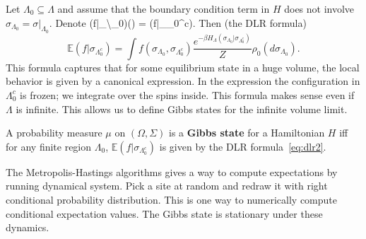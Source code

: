 \documentclass[12pt]{book}
\theoremstyle{norm}
\begin{document}
Let $\Lambda_0\subseteq \Lambda$ and assume that the boundary condition term in $H$ does not involve $\sigma_{\Lambda_0}=\sigma|_{\Lambda_0}$. Denote 
\be{}(f|\Sigma_{\Lambda\backslash \Lambda_0})(\sigma) = (f|\sigma_{\Lambda_0^c}). \ee
Then (the DLR formula)
\begin{equation}\label{eq:dlr2}
\mathbb{E}(f|\sigma_{\Lambda_0^c}) = \int f(\sigma_{\Lambda_0}, \sigma_{\Lambda_0^c})  \frac{e^{-\beta H_{\Lambda}(\sigma_{\Lambda_0}| \sigma_{\Lambda_0^c})}}{Z}\rho_0(d\sigma_{\Lambda_0}).
\end{equation}
This formula captures that for some equilibrium state in a huge volume, the local behavior is given by a canonical expression. 
In the expression the configuration in $\Lambda_0^c$ is frozen; we integrate over the spins inside. This formula makes sense even if $\Lambda$ is infinite. %
This allows us to define Gibbs states for the infinite volume limit.

\begin{definition}
A probability measure $\mu$ on $(\Omega,\Sigma)$ is a \textbf{Gibbs state} for a Hamiltonian $H$ iff for any finite region $\Lambda_0$,
$
\mathbb{E}(f|\sigma_{\Lambda_0^c})
$ 
is given by the DLR formula~\eqref{eq:dlr2}.
\end{definition}
The Metropolis-Hastings algorithms gives a way to compute expectations by running dynamical system. Pick a site at random and redraw it with right conditional probability distribution. This is one way to numerically compute conditional expectation values. %
The Gibbs state is stationary under these dynamics.
\end{document}
